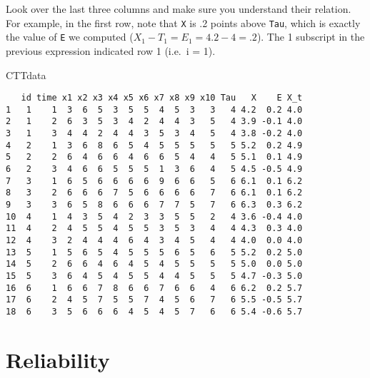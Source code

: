 \documentclass[
]{book}
\newenvironment{Shaded}{\begin{snugshade}}{\end{snugshade}}
\newcommand{\AttributeTok}[1]{\textcolor[rgb]{0.77,0.63,0.00}{#1}}
\newcommand{\DecValTok}[1]{\textcolor[rgb]{0.00,0.00,0.81}{#1}}
\newcommand{\FunctionTok}[1]{\textcolor[rgb]{0.00,0.00,0.00}{#1}}
\newcommand{\NormalTok}[1]{#1}
\newcommand{\OtherTok}[1]{\textcolor[rgb]{0.56,0.35,0.01}{#1}}
\newcommand{\SpecialCharTok}[1]{\textcolor[rgb]{0.00,0.00,0.00}{#1}}
\begin{document}
Look over the last three columns and make sure you understand their relation.
For example, in the first row, note that \texttt{X} is .2 points above \texttt{Tau}, which is exactly the value of \texttt{E} we computed (\(X_1 - T_1 = E_1 = 4.2 - 4 = .2\)).
The 1 subscript in the previous expression indicated row 1 (i.e.~i = 1).

\begin{Shaded}
\end{Shaded}

\begin{Shaded}
\begin{Highlighting}[]
\NormalTok{CTTdata}
\end{Highlighting}
\end{Shaded}

\begin{verbatim}
   id time x1 x2 x3 x4 x5 x6 x7 x8 x9 x10 Tau   X    E X_t
1   1    1  3  6  5  3  5  5  4  5  3   3   4 4.2  0.2 4.0
2   1    2  6  3  5  3  4  2  4  4  3   5   4 3.9 -0.1 4.0
3   1    3  4  4  2  4  4  3  5  3  4   5   4 3.8 -0.2 4.0
4   2    1  3  6  8  6  5  4  5  5  5   5   5 5.2  0.2 4.9
5   2    2  6  4  6  6  4  6  6  5  4   4   5 5.1  0.1 4.9
6   2    3  4  6  6  5  5  5  1  3  6   4   5 4.5 -0.5 4.9
7   3    1  6  5  6  6  6  6  9  6  6   5   6 6.1  0.1 6.2
8   3    2  6  6  6  7  5  6  6  6  6   7   6 6.1  0.1 6.2
9   3    3  6  5  8  6  6  6  7  7  5   7   6 6.3  0.3 6.2
10  4    1  4  3  5  4  2  3  3  5  5   2   4 3.6 -0.4 4.0
11  4    2  4  5  5  4  5  5  3  5  3   4   4 4.3  0.3 4.0
12  4    3  2  4  4  4  6  4  3  4  5   4   4 4.0  0.0 4.0
13  5    1  5  6  5  4  5  5  5  6  5   6   5 5.2  0.2 5.0
14  5    2  6  6  4  6  4  5  4  5  5   5   5 5.0  0.0 5.0
15  5    3  6  4  5  4  5  5  4  4  5   5   5 4.7 -0.3 5.0
16  6    1  6  6  7  8  6  6  7  6  6   4   6 6.2  0.2 5.7
17  6    2  4  5  7  5  5  7  4  5  6   7   6 5.5 -0.5 5.7
18  6    3  5  6  6  6  4  5  4  5  7   6   6 5.4 -0.6 5.7
\end{verbatim}

\hypertarget{reliability}{%
\section{Reliability}\label{reliability}}
\end{document}
